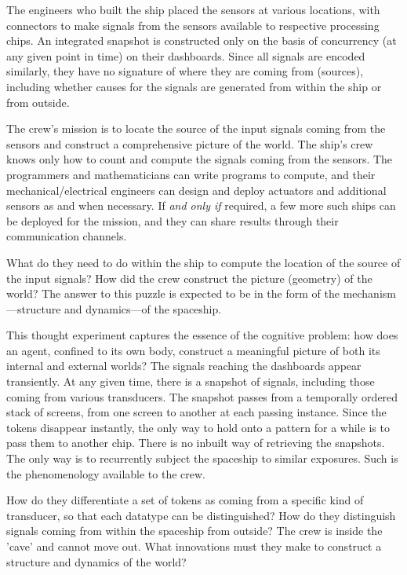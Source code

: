 The engineers who built the ship placed the sensors at various locations, with connectors to make signals from the sensors available to respective processing chips. An integrated snapshot is constructed only on the basis of concurrency (at any given point in time) on their dashboards. Since all signals are encoded similarly, they have no signature of where they are coming from (sources), including whether causes for the signals are generated from within the ship or from outside.

The crew's mission is to locate the source of the input signals coming from the sensors and construct a comprehensive picture of the world. The ship's crew knows only how to count and compute the signals coming from the sensors. The programmers and mathematicians can write programs to compute, and their mechanical/electrical engineers can design and deploy actuators and additional sensors as and when necessary. If \textit{and only if} required, a few more such ships can be deployed for the mission, and they can share results through their communication channels.

What do they need to do within the ship to compute the location of the source of the input signals? How did the crew construct the picture (geometry) of the world? The answer to this puzzle is expected to be in the form of the mechanism—structure and dynamics—of the spaceship.

This thought experiment captures the essence of the cognitive problem: how does an agent, confined to its own body, construct a meaningful picture of both its internal and external worlds? The signals reaching the dashboards appear transiently. At any given time, there is a snapshot of signals, including those coming from various transducers. The snapshot passes from a temporally ordered stack of screens, from one screen to another at each passing instance. Since the tokens disappear instantly, the only way to hold onto a pattern for a while is to pass them to another chip. There is no inbuilt way of retrieving the snapshots. The only way is to recurrently subject the spaceship to similar exposures. Such is the phenomenology available to the crew.

How do they differentiate a set of tokens as coming from a specific kind of transducer, so that each datatype can be distinguished? How do they distinguish signals coming from within the spaceship from outside? The crew is inside the 'cave' and cannot move out. What innovations must they make to construct a structure and dynamics of the world?


